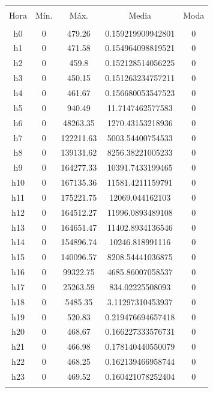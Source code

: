 \documentclass[conference, 10pt]{IEEEtran}
\begin{document}
\begin{table}[!htbp] \centering 
  \caption{} 
  \label{} 
\begin{tabular}{@{\extracolsep{5pt}} ccccc} 
\\[-1.8ex]\hline 
\hline \\[-1.8ex] 
Hora & Mín. & Máx. & Media & Moda \\ 
\hline \\[-1.8ex] 
h0 & 0 & 479.26 & 0.159219909942801 & 0 \\ 
h1 & 0 & 471.58 & 0.154964098819521 & 0 \\ 
h2 & 0 & 459.8 & 0.152128514056225 & 0 \\ 
h3 & 0 & 450.15 & 0.151263234757211 & 0 \\ 
h4 & 0 & 461.67 & 0.156680053547523 & 0 \\ 
h5 & 0 & 940.49 & 11.7147462577583 & 0 \\ 
h6 & 0 & 48263.35 & 1270.43153218936 & 0 \\ 
h7 & 0 & 122211.63 & 5003.54400754533 & 0 \\ 
h8 & 0 & 139131.62 & 8256.38221005233 & 0 \\ 
h9 & 0 & 164277.33 & 10391.7433199465 & 0 \\ 
h10 & 0 & 167135.36 & 11581.4211159791 & 0 \\ 
h11 & 0 & 175221.75 & 12069.044162103 & 0 \\ 
h12 & 0 & 164512.27 & 11996.0893489108 & 0 \\ 
h13 & 0 & 164651.47 & 11402.8934136546 & 0 \\ 
h14 & 0 & 154896.74 & 10246.818991116 & 0 \\ 
h15 & 0 & 140096.57 & 8208.54441036875 & 0 \\ 
h16 & 0 & 99322.75 & 4685.86007058537 & 0 \\ 
h17 & 0 & 25263.59 & 834.02225508093 & 0 \\ 
h18 & 0 & 5485.35 & 3.11297310453937 & 0 \\ 
h19 & 0 & 520.83 & 0.219476694657418 & 0 \\ 
h20 & 0 & 468.67 & 0.166227333576731 & 0 \\ 
h21 & 0 & 466.98 & 0.178140440550079 & 0 \\ 
h22 & 0 & 468.25 & 0.162139466958744 & 0 \\ 
h23 & 0 & 469.52 & 0.160421078252404 & 0 \\ 
\hline \\[-1.8ex] 
\end{tabular} 
\end{table}
\end{document}
